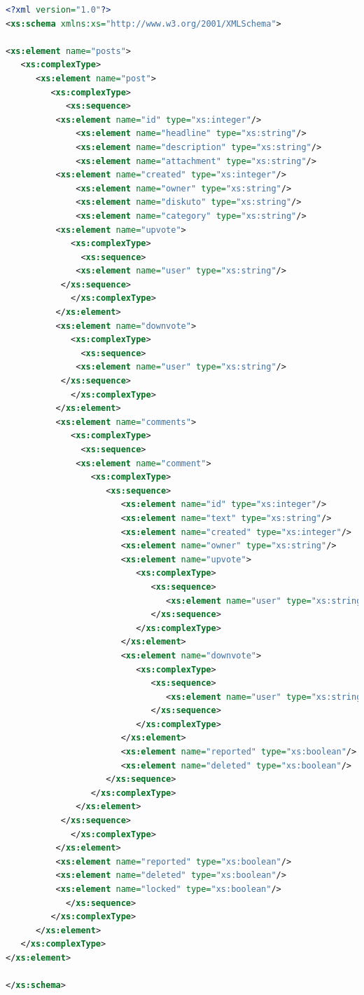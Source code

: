 \documentclass{foi}
\begin{document}
\begin{lstlisting}[language=XML]
 <?xml version="1.0"?>
<xs:schema xmlns:xs="http://www.w3.org/2001/XMLSchema">

<xs:element name="posts">
   <xs:complexType>
      <xs:element name="post">
         <xs:complexType>
            <xs:sequence>
	      <xs:element name="id" type="xs:integer"/>
              <xs:element name="headline" type="xs:string"/>
              <xs:element name="description" type="xs:string"/>
              <xs:element name="attachment" type="xs:string"/>
	      <xs:element name="created" type="xs:integer"/>
              <xs:element name="owner" type="xs:string"/>
              <xs:element name="diskuto" type="xs:string"/>
              <xs:element name="category" type="xs:string"/>
	      <xs:element name="upvote">
	         <xs:complexType>
	           <xs:sequence>
		      <xs:element name="user" type="xs:string"/>
		   </xs:sequence>
	         </xs:complexType>
	      </xs:element>
	      <xs:element name="downvote">
	         <xs:complexType>
	           <xs:sequence>
		      <xs:element name="user" type="xs:string"/>
		   </xs:sequence>
	         </xs:complexType>
	      </xs:element>
	      <xs:element name="comments">
	         <xs:complexType>
	           <xs:sequence>
		      <xs:element name="comment">
		         <xs:complexType>
		            <xs:sequence>
		               <xs:element name="id" type="xs:integer"/>
		               <xs:element name="text" type="xs:string"/>
		               <xs:element name="created" type="xs:integer"/>
		               <xs:element name="owner" type="xs:string"/>
		               <xs:element name="upvote">
		                  <xs:complexType>
		                     <xs:sequence>
		                        <xs:element name="user" type="xs:string"/>
		                     </xs:sequence>
		                  </xs:complexType>
		               </xs:element>
		               <xs:element name="downvote">
		                  <xs:complexType>
		                     <xs:sequence>
		                        <xs:element name="user" type="xs:string"/>
		                     </xs:sequence>
		                  </xs:complexType>
		               </xs:element>
		               <xs:element name="reported" type="xs:boolean"/>
		               <xs:element name="deleted" type="xs:boolean"/>
		            </xs:sequence>
		         </xs:complexType>
		      </xs:element>
		   </xs:sequence>
	         </xs:complexType>
	      </xs:element>
	      <xs:element name="reported" type="xs:boolean"/>
	      <xs:element name="deleted" type="xs:boolean"/>
	      <xs:element name="locked" type="xs:boolean"/>
            </xs:sequence>
         </xs:complexType>
      </xs:element>
   </xs:complexType>
</xs:element>

</xs:schema> 
\end{lstlisting}
\end{document}

